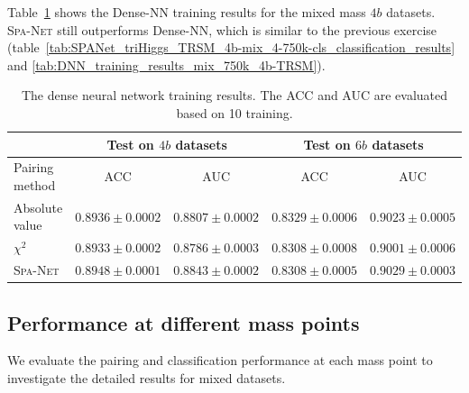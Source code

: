 \documentclass[12pt]{article}
\begin{document}
    Table~\ref{tab:DNN_training_results_mix_5-250k-4b-TRSM} shows the Dense-NN training results for the mixed mass $4b$ datasets. \textsc{Spa-Net} still outperforms Dense-NN, which is similar to the previous exercise (table~\ref{tab:SPANet_triHiggs_TRSM_4b-mix_4-750k-cls_classification_results} and \ref{tab:DNN_training_results_mix_750k_4b-TRSM}).
    \begin{table}[htpb]
        \centering
        \caption{The dense neural network training results. The ACC and AUC are evaluated based on 10 training.}
        \label{tab:DNN_training_results_mix_5-250k-4b-TRSM}
        \begin{tabular}{l|cc|cc}
                         & \multicolumn{2}{c|}{Test on $4b$ datasets}& \multicolumn{2}{c}{Test on $6b$ datasets} \\ \hline
        Pairing method   & ACC                 & AUC                 & ACC                 & AUC                 \\ \hline
        Absolute value   & $0.8936 \pm 0.0002$ & $0.8807 \pm 0.0002$ & $0.8329 \pm 0.0006$ & $0.9023 \pm 0.0005$ \\
        $\chi^2$         & $0.8933 \pm 0.0002$ & $0.8786 \pm 0.0003$ & $0.8308 \pm 0.0008$ & $0.9001 \pm 0.0006$ \\
        \textsc{Spa-Net} & $0.8948 \pm 0.0001$ & $0.8843 \pm 0.0002$ & $0.8308 \pm 0.0005$ & $0.9029 \pm 0.0003$
        \end{tabular}
    \end{table}
    \subsection{Performance at different mass points}%
    \label{sub:performance_at_different_mass_points}
        We evaluate the pairing and classification performance at each mass point to investigate the detailed results for mixed datasets.
\end{document}
